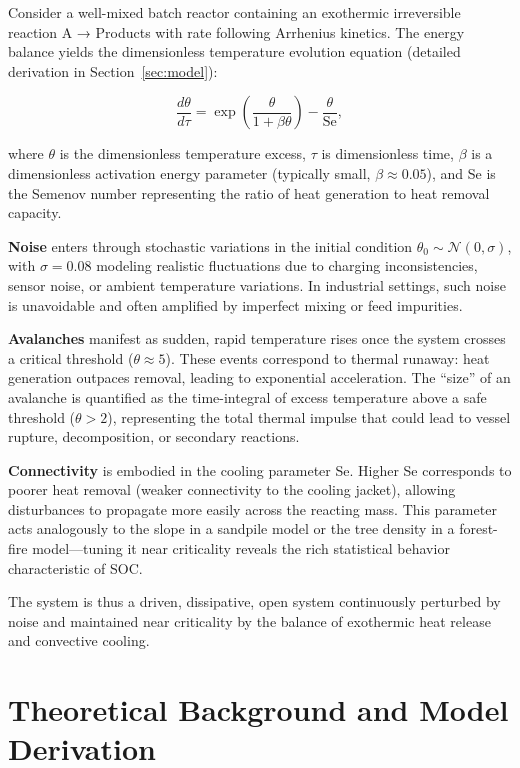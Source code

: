 \documentclass[11pt,a4paper]{article}
\begin{document}
Consider a well-mixed batch reactor containing an exothermic irreversible reaction A → Products with rate following Arrhenius kinetics. The energy balance yields the dimensionless temperature evolution equation (detailed derivation in Section~\ref{sec:model}):

\begin{equation}
\frac{d\theta}{d\tau} = \exp\left(\frac{\theta}{1 + \beta\theta}\right) - \frac{\theta}{\text{Se}},
\end{equation}

where $\theta$ is the dimensionless temperature excess, $\tau$ is dimensionless time, $\beta$ is a dimensionless activation energy parameter (typically small, $\beta \approx 0.05$), and Se is the Semenov number representing the ratio of heat generation to heat removal capacity.

\textbf{Noise} enters through stochastic variations in the initial condition $\theta_0 \sim \mathcal{N}(0, \sigma)$, with $\sigma = 0.08$ modeling realistic fluctuations due to charging inconsistencies, sensor noise, or ambient temperature variations. In industrial settings, such noise is unavoidable and often amplified by imperfect mixing or feed impurities.

\textbf{Avalanches} manifest as sudden, rapid temperature rises once the system crosses a critical threshold ($\theta \approx 5$). These events correspond to thermal runaway: heat generation outpaces removal, leading to exponential acceleration. The ``size'' of an avalanche is quantified as the time-integral of excess temperature above a safe threshold ($\theta > 2$), representing the total thermal impulse that could lead to vessel rupture, decomposition, or secondary reactions.

\textbf{Connectivity} is embodied in the cooling parameter Se. Higher Se corresponds to poorer heat removal (weaker connectivity to the cooling jacket), allowing disturbances to propagate more easily across the reacting mass. This parameter acts analogously to the slope in a sandpile model or the tree density in a forest-fire model—tuning it near criticality reveals the rich statistical behavior characteristic of SOC.

The system is thus a driven, dissipative, open system continuously perturbed by noise and maintained near criticality by the balance of exothermic heat release and convective cooling.

\section{Theoretical Background and Model Derivation}
\label{sec:background}
\end{document}
